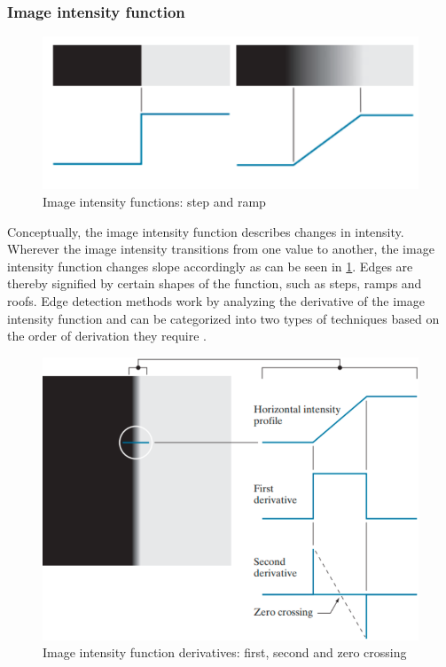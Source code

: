 \subsubsection*{Image intensity function}
\begin{figure}[h]
	\centerline{\includegraphics[scale=0.5]{images/edgeModel.png}}
	\caption{Image intensity functions: step and ramp \cite{gonzalezDigitalImageProcessing2007}}\label{fig:iif}
\end{figure}
\noindent
Conceptually, the image intensity function describes changes in intensity.
Wherever the image intensity transitions from one value to another,
the image intensity function changes slope accordingly as can be seen in \cref{fig:iif}.
Edges are thereby signified by certain shapes of the function, such as steps, ramps and roofs.
Edge detection methods work by analyzing the derivative of the image intensity function and
can be categorized into two types of techniques based on the order of derivation they require \cite{gonzalezDigitalImageProcessing2007}.
\begin{figure}[h]
	\centerline{\includegraphics[scale=0.5]{images/edgeModelOrders.png}}
	\caption{Image intensity function derivatives: first, second and zero crossing \cite{gonzalezDigitalImageProcessing2007}}\label{fig:iifO}
\end{figure}
\noindent
